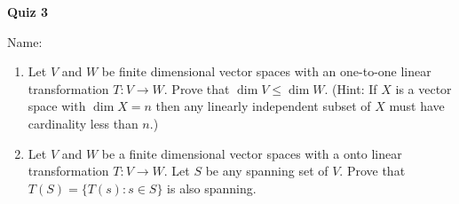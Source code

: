 \documentclass{article}
\begin{document}
\begin{center}
    {\bf Quiz 3}
\end{center}
Name:


\begin{enumerate}
    \item
        Let $V$ and $W$ be finite dimensional vector spaces with an one-to-one
        linear transformation $T:V\to W$. Prove that $\dim V \leq \dim W$.
        (Hint: If $X$ is a vector space with $\dim X=n$ then any linearly
        independent subset of $X$ must have cardinality less than $n$.)
        \vfill
    \item
        Let $V$ and $W$ be a finite dimensional vector spaces with a onto
        linear transformation $T:V\to W$. Let $S$ be any spanning set of $V$.
        Prove that $T(S)=\{T(s):s\in S\}$ is also spanning.
        \vfill
\end{enumerate}
    
\end{document}
